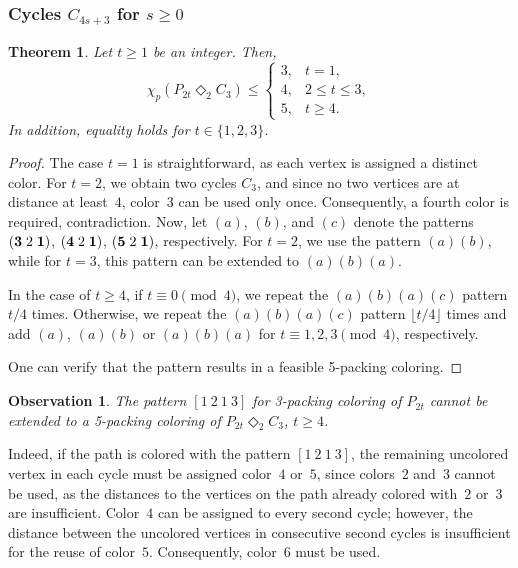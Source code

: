 \documentclass{article}
\newtheorem{theorem}{Theorem}
\newtheorem{observation}{Observation}
\begin{document}
\subsubsection{Cycles $C_{4s+3}$ for $s\geq 0$ }
\begin{theorem} \label{thm:pathAlignedCycle}
Let $t\geq 1$ be an integer. Then, 
    $$\chi_p(P_{2t}\Diamond_2 C_3)\leq\left\{
\begin{array}{ll}
3, & t=1,\\
4, & 2 \leq t \leq 3,\\
5, & t\geq 4.
\end{array}\right.
$$
In addition, equality holds for $t\in\{1,2,3\}$. 
\end{theorem}
\begin{proof}
The case $t = 1$ is straightforward, as each vertex is assigned a distinct color. For $t = 2$, we obtain two cycles $C_3$, and since no two vertices are at distance at least~$4$, color~$3$ can be used only once. Consequently, a fourth color is required, contradiction.  Now, let $(a)$, $(b)$, and $(c)$ denote the patterns 
$({\bf 3}\;2\;{\bf 1})$, $({\bf 4}\; 2\; {\bf 1})$, $({\bf 5}\;2\;{\bf 1})$, respectively. For $t=2$, we use the pattern $(a) (b)$, while for $t=3$, this pattern can be extended to $(a)(b)(a)$.


\noindent In the case of $t\geq 4$, if $t \equiv 0 \pmod{4}$, we repeat the $(a)(b)(a)(c)$ pattern $t/4$ times. Otherwise, we repeat the $(a)(b)(a)(c)$ pattern $\lfloor t /4 \rfloor$ times and add $(a)$, $(a)(b)$ or $(a)(b)(a)$ for $t \equiv 1, 2, 3 \pmod{4}$, respectively.

One can verify that the pattern results in a feasible 5-packing coloring.
\end{proof}
\begin{observation}
    The pattern $[1\ 2\ 1\ 3]$ for 3-packing coloring of $P_{2t}$ cannot be extended to a 5-packing coloring of $P_{2t} \Diamond_2 C_3$, $t\geq 4$.
\end{observation}

Indeed, if the path is colored with the pattern $[1\ 2\ 1\ 3]$, the remaining uncolored vertex in each cycle must be assigned color~$4$ or~$5$, since colors~$2$ and~$3$ cannot be used, as the distances to the vertices on the path already colored with~$2$ or~$3$ are insufficient. Color~$4$ can be assigned to every second cycle; however, the distance between the uncolored vertices in consecutive second cycles is insufficient for the reuse of color~$5$. Consequently, color~$6$ must be used.
\end{document}
